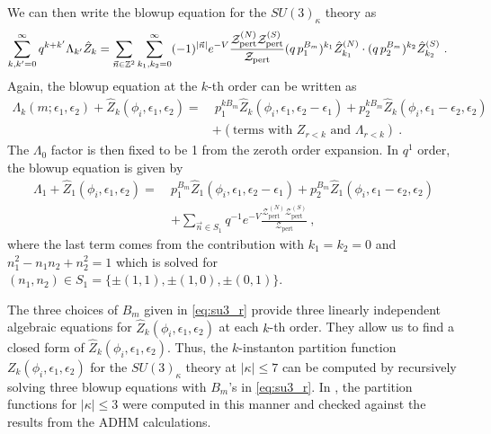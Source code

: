We can then write the blowup equation for the $SU(3)_\kappa$ theory as
\begin{align}
\sum_{k, k'=0}^{\infty} q^{k+k'} \Lambda_{k'} \hat{Z}_k &= \sum_{\vec{n}\in \mathbb{Z}^2}\sum_{k_1,k_2=0}^\infty (-1)^{\abs{\vec{n}}} e^{-V} \frac{\mathcal{Z}_{\mathrm{pert}}^{(N)} \mathcal{Z}_{\mathrm{pert}}^{(S)}}{\mathcal{Z}_{\mathrm{pert}}} (q \,p_1^{B_m})^{k_1} \hat{Z}^{(N)}_{k_1} \cdot (q \,p_2^{B_m})^{k_2} \hat{Z}^{(S)}_{k_2} \ .
\end{align}
Again, the blowup equation at the $ k $-th order can be written as
\begin{align}\label{eq:su3_k_kinst}
\Lambda_k(m; \epsilon_1, \epsilon_2) + \hat{Z}_k(\phi_i, \epsilon_1, \epsilon_2)
=&~ p_1^{kB_m} \hat{Z}_k(\phi_i, \epsilon_1, \epsilon_2 - \epsilon_1) + p_2^{kB_m}\hat{Z}_k(\phi_i, \epsilon_1 - \epsilon_2, \epsilon_2) \nonumber \\
& + (\text{terms with } Z_{r<k} \text{ and } \Lambda_{r<k})\ .
\end{align}
The $ \Lambda_0 $ factor is then fixed to be 1 from the zeroth order expansion. In $ q^1 $ order, the blowup equation is given by
\begin{align}\label{eq:su3_k_1inst}
\Lambda_1 + \hat{Z}_1(\phi_i, \epsilon_1, \epsilon_2)
= ~& p_1^{B_m} \hat{Z}_1(\phi_i, \epsilon_1, \epsilon_2 - \epsilon_1) + p_2^{B_m} \hat{Z}_1(\phi_i, \epsilon_1 - \epsilon_2, \epsilon_2) \nonumber \\
& +  \sum_{\vec{n} \in S_1} q^{-1} e^{-V} \frac{\mathcal{Z}_{\mathrm{pert}}^{(N)} \mathcal{Z}_{\mathrm{pert}}^{(S)}}{\mathcal{Z}_{\mathrm{pert}}} \ ,
\end{align}
where the last term comes from the contribution with $k_1=k_2=0$ and $n_1^2 - n_1 n_2 +n_2^2 =1$ which is solved for $(n_1,n_2)\in S_1 = \{\pm(1, 1), \pm(1, 0), \pm(0, 1) \}$.

The three choices of $ B_m $ given in \eqref{eq:su3_r} provide three linearly independent  algebraic equations for $\hat{Z}_k(\phi_i, \epsilon_1, \epsilon_2)$ at each $k$-th order.
They allow us to find a closed form of $\hat{Z}_k(\phi_i, \epsilon_1, \epsilon_2)$. Thus, the $k$-instanton partition function $Z_k(\phi_i, \epsilon_1, \epsilon_2)$ for the $SU(3)_\kappa$ theory at $|\kappa|\le 7$ can be computed by recursively solving three blowup equations with $B_m$'s in  \eqref{eq:su3_r}. In \cite{Kim:2019uqw}, the partition functions for $|\kappa|\le 3$ were computed in this manner and checked against the results from the ADHM calculations.


